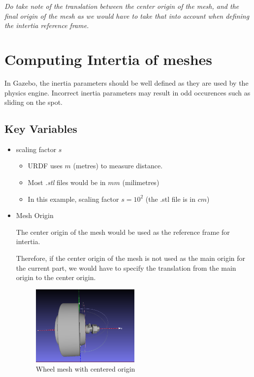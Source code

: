 \documentclass[11pt]{article}
\begin{document}
\emph{Do take note of the translation between the center origin of the mesh, and the final origin of the mesh as we would have to take that into account when defining the intertia reference frame.}
\section{Computing Intertia of meshes}
In Gazebo, the inertia parameters should be well defined as they are used by the physics engine.
Incorrect inertia parameters may result in odd occurences such as sliding on the spot.
\subsection{Key Variables}
\begin{itemize}
 \item {
       scaling factor $s$
       \begin{itemize}
        \item {URDF uses $m$ (metres) to measure distance.}
        \item{ Most \emph{.stl} files would be in $mm$ (milimetres) }
        \item{In this example, scaling factor $s=10^2$ (the .stl file is in $cm$)}
       \end{itemize}
       }
 \item{
       Mesh Origin

       The center origin of the mesh would be used as the reference frame for intertia.

       Therefore, if the center origin of the mesh is not used as the main origin for the current part, we would have to
       specify the translation from the main origin to the center origin.


       \begin{figure}[!htb]
        \centering
        \includegraphics[width=0.5\textwidth]{images/centeredwheel}
        \caption{Wheel mesh with centered origin}
       \end{figure}


}
\end{itemize}
\end{document}
